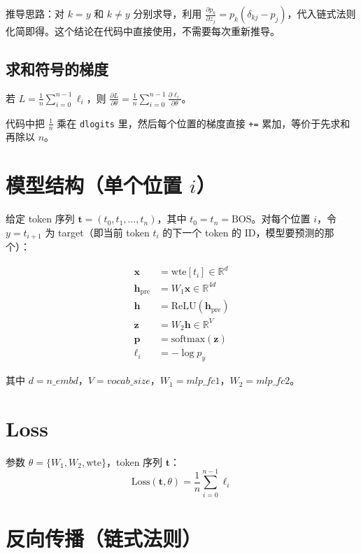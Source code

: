\documentclass[12pt,a4paper]{article}
\begin{document}
推导思路：对 $k = y$ 和 $k \neq y$ 分别求导，利用 $\frac{\partial p_k}{\partial z_j} = p_k(\delta_{kj} - p_j)$，代入链式法则化简即得。这个结论在代码中直接使用，不需要每次重新推导。

\subsection{求和符号的梯度}

若 $L = \frac{1}{n}\sum_{i=0}^{n-1} \ell_i$，则 $\displaystyle \frac{\partial L}{\partial \theta} = \frac{1}{n}\sum_{i=0}^{n-1} \frac{\partial \ell_i}{\partial \theta}$。

代码中把 $\frac{1}{n}$ 乘在 \texttt{dlogits} 里，然后每个位置的梯度直接 \texttt{+=} 累加，等价于先求和再除以 $n$。

\section{模型结构（单个位置 $i$）}

给定 token 序列 $\mathbf{t} = (t_0, t_1, \dots, t_n)$，其中 $t_0 = t_n = \text{BOS}$。对每个位置 $i$，令 $y = t_{i+1}$ 为 target（即当前 token $t_i$ 的下一个 token 的 ID，模型要预测的那个）：

\begin{align*}
\mathbf{x} &= \text{wte}[t_i] \in \mathbb{R}^{d} \\
\mathbf{h}_{\text{pre}} &= W_1 \mathbf{x} \in \mathbb{R}^{4d} \\
\mathbf{h} &= \text{ReLU}(\mathbf{h}_{\text{pre}}) \\
\mathbf{z} &= W_2 \mathbf{h} \in \mathbb{R}^{V} \\
\mathbf{p} &= \text{softmax}(\mathbf{z}) \\
\ell_i &= -\log p_y
\end{align*}

其中 $d = n\_embd$，$V = vocab\_size$，$W_1 = mlp\_fc1$，$W_2 = mlp\_fc2$。

\section{Loss}

参数 $\theta = \{W_1, W_2, \text{wte}\}$，token 序列 $\mathbf{t}$：
\[
\text{Loss}(\mathbf{t}, \theta) = \frac{1}{n} \sum_{i=0}^{n-1} \ell_i
\]

\section{反向传播（链式法则）}
\end{document}
